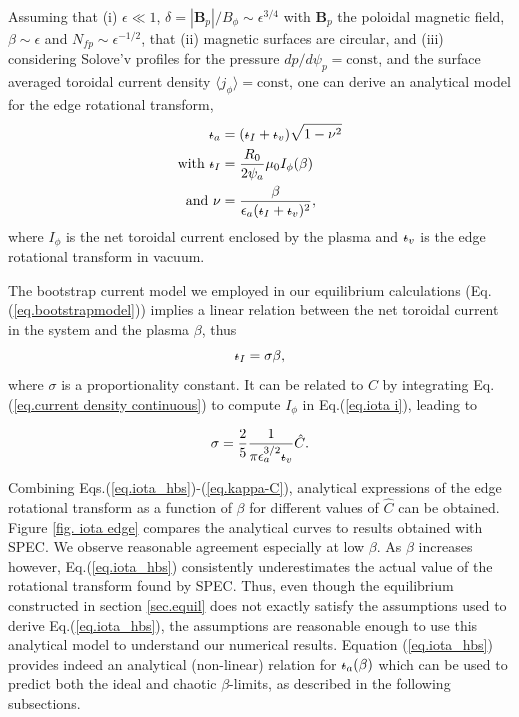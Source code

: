 \documentclass[my_thesis.tex]{subfiles}
\begin{document}
Assuming that (i) $\epsilon\ll1$, $\delta=|\mathbf{B}_p|/B_\phi\sim\epsilon^{3/4}$ with $\mathbf{B}_p$ the poloidal magnetic field, $\beta\sim\epsilon$ and $N_{fp}\sim\epsilon^{-1/2}$, that (ii) magnetic surfaces are circular, and (iii) considering Solove'v profiles for the pressure $dp/d\psi_p=\text{const}$, and the surface averaged toroidal current density $\langle j_\phi\rangle=\text{const}$, one can derive \citep{wakataniStellaratorHeliotronDevices1998,Freidberg2014} an analytical model for the edge rotational transform,
\begin{align}
	\iotabar_a &= (\iotabar_I+\iotabar_v)\sqrt{1-\nu^2}\label{eq.iota_hbs}\\ 
	\text{with}\ \iotabar_I &= 
	\frac{R_0}{2\psi_a}\mu_0I_\phi(\beta)\\ \label{eq.iota i}
	\text{and}\ \nu &= \frac{\beta}{\epsilon_a(\iotabar_I+\iotabar_v)^2},
\end{align}
where $I_\phi$ is the net toroidal current enclosed by the plasma and $\text{$\iota\!\!$-}_v$ is the edge rotational transform in vacuum.

The bootstrap current model we employed in our equilibrium calculations (Eq.(\ref{eq.bootstrapmodel})) implies a linear relation between the net toroidal current in the system and the plasma $\beta$, thus
\begin{equation}
	\text{$\iota\!\!$-}_I = \sigma\beta,
\end{equation}
where $\sigma$ is a proportionality constant. It can be related to $C$ by integrating Eq.(\ref{eq.current density continuous}) to compute $I_\phi$ in Eq.(\ref{eq.iota i}), leading to

\begin{equation}
	\sigma = \frac{2}{5}\frac{1}{\pi \epsilon_a^{3/2}\text{$\iota\!\!$-}_v}\hat{C}.\label{eq.kappa-C}
\end{equation}

Combining Eqs.(\ref{eq.iota_hbs})-(\ref{eq.kappa-C}), analytical expressions of the edge rotational transform as a function of $\beta$ for different values of $\hat{C}$ can be obtained. Figure \ref{fig. iota edge} compares the analytical curves to results obtained with SPEC.  We observe reasonable agreement especially at low $\beta$. As $\beta$ increases however, Eq.(\ref{eq.iota_hbs}) consistently underestimates the actual value of the rotational transform found by SPEC. Thus, even though the equilibrium constructed in section \ref{sec.equil} does not exactly satisfy the assumptions used to derive Eq.(\ref{eq.iota_hbs}), the assumptions are reasonable enough to use this analytical model to understand our numerical results. Equation (\ref{eq.iota_hbs}) provides indeed an analytical (non-linear) relation for $\text{$\iota\!\!$-}_a(\beta)$ which can be used to predict both the ideal and chaotic $\beta$-limits, as described in the following subsections.
\end{document}
